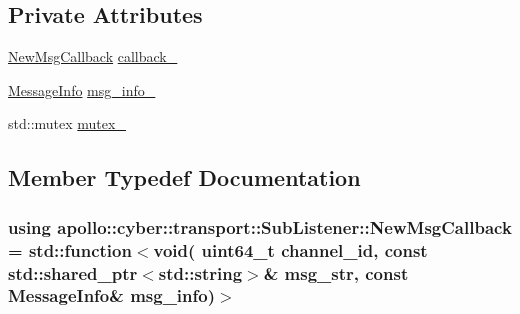 \subsection*{Private Attributes}
\begin{DoxyCompactItemize}
\item 
\hyperlink{classapollo_1_1cyber_1_1transport_1_1SubListener_a68a33307591d34661a88c1e637bb3d8f}{New\-Msg\-Callback} \hyperlink{classapollo_1_1cyber_1_1transport_1_1SubListener_a746c089299d8d41460212473548dc83c}{callback\-\_\-}
\item 
\hyperlink{classapollo_1_1cyber_1_1transport_1_1MessageInfo}{Message\-Info} \hyperlink{classapollo_1_1cyber_1_1transport_1_1SubListener_aef38d53df57590f133bdebbb55088f99}{msg\-\_\-info\-\_\-}
\item 
std\-::mutex \hyperlink{classapollo_1_1cyber_1_1transport_1_1SubListener_af840084b22d5c95912836e1097f21ef6}{mutex\-\_\-}
\end{DoxyCompactItemize}


\subsection{Member Typedef Documentation}
\hypertarget{classapollo_1_1cyber_1_1transport_1_1SubListener_a68a33307591d34661a88c1e637bb3d8f}{
\subsubsection[{New\-Msg\-Callback}]{\setlength{\rightskip}{0pt plus 5cm}using {\bf apollo\-::cyber\-::transport\-::\-Sub\-Listener\-::\-New\-Msg\-Callback} =  std\-::function$<$void( uint64\-\_\-t channel\-\_\-id, const std\-::shared\-\_\-ptr$<$std\-::string$>$\& msg\-\_\-str, const {\bf Message\-Info}\& msg\-\_\-info)$>$}}\label{classapollo_1_1cyber_1_1transport_1_1SubListener_a68a33307591d34661a88c1e637bb3d8f}


